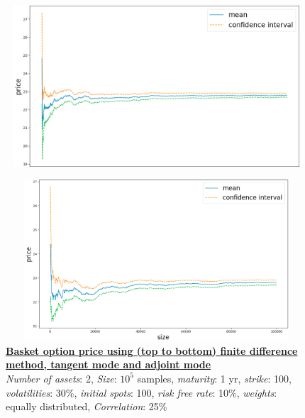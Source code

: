 \documentclass {article}
\begin{document}
			
			\begin{center}
				\begin{figure}[!h]
					\centering
				        \includegraphics[width=15cm, height=6cm]{stdBasketOptionTangentModePrice.png}
				\end{figure}
			\end{center}

			\begin{center}
				\begin{figure}[!h]
					\centering
						\includegraphics[width=15cm, height=6cm]{stdBasketOptionAdjointModePrice.png}
						\caption{\textbf{\underline{Basket option price using (top to bottom) finite difference method, tangent mode and adjoint mode}} 
						\\ \textit{Number of assets}: 2, \textit{Size}: $10^{5}$ samples, \textit{maturity}: 1 yr, \textit{strike}: 100, \textit{volatilities}: 30\%, \textit{initial spots}: 100, \textit{risk free rate}: 10\%, \textit{weights}: equally distributed, \textit{Correlation}: 25\%}
				\end{figure}
			\end{center}
	
			\newpage
			
\end{document}
